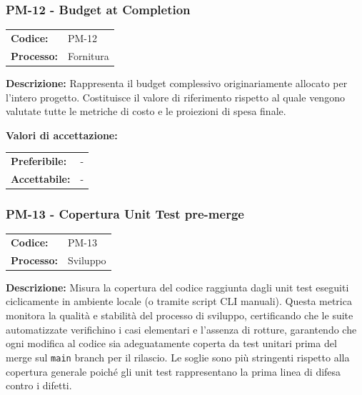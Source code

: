 \documentclass[a4paper,11pt,oneside]{scrartcl}
\begin{document}
\subsubsection{PM-12 - Budget at Completion}

\noindent
\begin{tabular}{@{}p{}p{}@{}}
    \textbf{Codice:}   & PM-12     \\
    \textbf{Processo:} & Fornitura \\
\end{tabular}

\vspace{0.3cm}
\noindent\textbf{Descrizione:} Rappresenta il budget complessivo originariamente allocato per l'intero progetto. Costituisce il valore di riferimento rispetto al quale vengono valutate tutte le metriche di costo e le proiezioni di spesa finale.

\vspace{0.2cm}
\noindent\textbf{Valori di accettazione:}
\vspace{0.1cm}

\noindent
\begin{tabular}{@{}ll@{}}
    \textbf{Preferibile:} & - \\
    \textbf{Accettabile:} & - \\
\end{tabular}

\subsubsection{PM-13 - Copertura Unit Test pre-merge}

\noindent
\begin{tabular}{@{}p{}p{}@{}}
    \textbf{Codice:}   & PM-13    \\
    \textbf{Processo:} & Sviluppo \\
\end{tabular}

\vspace{0.3cm}
\noindent\textbf{Descrizione:} Misura la copertura del codice raggiunta dagli unit test{\scriptsize{}} eseguiti ciclicamente in ambiente locale (o tramite script CLI manuali). Questa metrica monitora la qualità e stabilità del processo di sviluppo, certificando che le suite automatizzate verifichino i casi elementari e l'assenza di rotture, garantendo che ogni modifica al codice sia adeguatamente coperta da test unitari prima del merge sul \texttt{main} branch per il rilascio. Le soglie sono più stringenti rispetto alla copertura generale poiché gli unit test rappresentano la prima linea di difesa contro i difetti.
\end{document}
